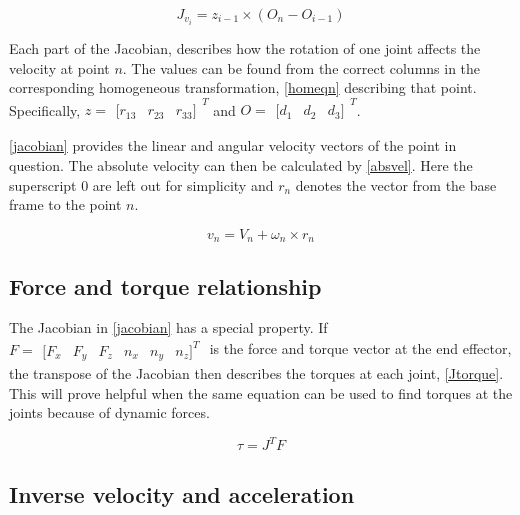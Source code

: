 \begin{equation}\label{Jvi}
J_{v_i} = z_{i-1}\times (O_n - O_{i-1})
\end{equation}

Each part of the Jacobian,  describes how the rotation of one joint affects the velocity at point $n$. The values can be found from the correct columns in the corresponding homogeneous transformation, \eqref{homeqn} describing that point. Specifically, $z=\begin{matrix}[
r_{13} & r_{23} & r_{33}]
\end{matrix}^T$ and $O=\begin{matrix}[
d_{1} & d_{2} & d_{3}]
\end{matrix}^T$.

\eqref{jacobian} provides the linear and angular velocity vectors of the point in question. The absolute velocity can then be calculated by \eqref{absvel}. Here the superscript $0$ are left out for simplicity and $r_n$ denotes the vector from the base frame to the point $n$.

\begin{equation}\label{absvel}
v_{n}=V_n+\omega_n\times r_n
\end{equation}

\subsection{Force and torque relationship}

The Jacobian in \eqref{jacobian} has a special property. If $F = \begin{matrix}[
F_{x} & F_{y} & F_{z} & n_x & n_y & n_z]^T
\end{matrix}$ is the force and torque vector at the end effector, the transpose of the Jacobian then describes the torques at each joint, \eqref{Jtorque}. This will prove helpful when the same equation can be used to find torques at the joints because of dynamic forces.

\begin{equation}\label{Jtorque}
\tau = J^T F
\end{equation}

\subsection{Inverse velocity and acceleration}
